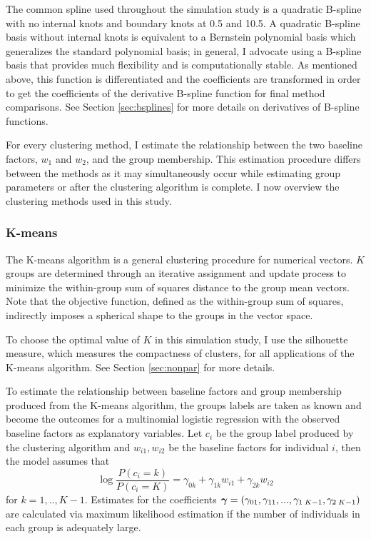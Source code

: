 The common spline used throughout the simulation study is a quadratic B-spline with no internal knots and boundary knots at 0.5 and 10.5. A quadratic B-spline basis without internal knots is equivalent to a Bernstein polynomial basis \cite{lorentz1953} which generalizes the standard polynomial basis; in general, I advocate using a B-spline basis that provides much flexibility and is computationally stable.  As mentioned above, this function is differentiated and the coefficients are transformed in order to get the coefficients of the derivative B-spline function for final method comparisons. See Section \ref{sec:bsplines} for more details on derivatives of B-spline functions.

For every clustering method, I estimate the relationship between the two baseline factors, $w_{1}$ and $w_{2}$, and the group membership. This estimation procedure differs between the methods as it may simultaneously occur while estimating group parameters or after the clustering algorithm is complete. I now overview the clustering methods used in this study.

\subsubsection{K-means}
The K-means algorithm is a general clustering procedure for numerical vectors. $K$ groups are determined through an iterative assignment and update process to minimize the within-group sum of squares distance to the group mean vectors. Note that the objective function, defined as the within-group sum of squares, indirectly imposes a spherical shape to the groups in the vector space.

To choose the optimal value of $K$ in this simulation study, I use the silhouette measure, which measures the compactness of clusters, for all applications of the K-means algorithm. See Section \ref{sec:nonpar} for more details. 

To estimate the relationship between baseline factors and group membership produced from the K-means algorithm, the groups labels are taken as known and become the outcomes for a multinomial logistic regression with the observed baseline factors as explanatory variables. Let $c_{i}$ be the group label produced by the clustering algorithm and $w_{i1}, w_{i2}$ be the baseline factors for individual $i$, then the model assumes that
$$\log\frac{P(c_{i}=k)}{P(c_{i}=K)} = \gamma_{0k}+\gamma_{1k}w_{i1}+\gamma_{2k}w_{i2}$$
for $k=1,..,K-1$. Estimates for the coefficients $\boldsymbol\gamma = (\gamma_{01},\gamma_{11},...,\gamma_{1\;K-1},\gamma_{2\;K-1})$ are calculated via maximum likelihood estimation if the number of individuals in each group is adequately large.

